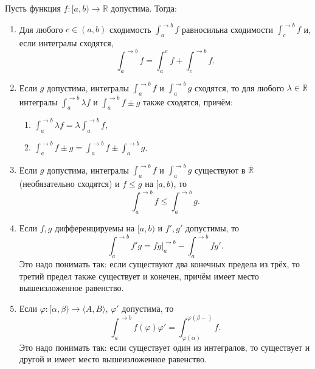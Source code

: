 \begin{theorem}
	Пусть функция \(f \colon [a, b) \to \mathbb{R}\) допустима. Тогда:
	\begin{enumerate}
		\item Для любого \(c \in (a, b)\) сходимость \(\int_a^{\to b} f\) равносильна сходимости \(\int_c^{\to b} f\) и, если интегралы сходятся, \[
		\int_a^{\to b} f = \int_a^c f + \int_c^{\to b} f.
		\]
		\item Если \(g\) допустима, интегралы \(\int_a^{\to b} f\) и \(\int_a^{\to b} g\) сходятся, то для любого \(\lambda \in \mathbb{R}\) интегралы \(\int_a^{\to b} \lambda f\) и \(\int_a^{\to b} f \pm g\) также сходятся, причём:
		\begin{enumerate}
			\item \(\displaystyle\int_a^{\to b} \lambda f = \lambda \displaystyle\int_a^{\to b} f\),
			\item \(\displaystyle\int_a^{\to b} f \pm g = \displaystyle\int_a^{\to b} f \pm \displaystyle\int_a^{\to b} g\).
		\end{enumerate}
		\item Если \(g\) допустима, интегралы \(\int_a^{\to b} f\) и \(\int_a^{\to b} g\) существуют в \(\overline{\mathbb{R}}\) (необязательно сходятся) и \(f \leqslant g\) на \([a, b)\), то \[
		\int_a^{\to b} f \leqslant \int_a^{\to b} g.
		\]
		\item Если \(f, g\) дифференцируемы на \([a, b)\) и \(f', g'\) допустимы, то \[
		\int_a^{\to b} f'g = fg \bigg|_a^{\to b} - \int_a^{\to b} fg'.
		\]
		Это надо понимать так: если существуют два конечных предела из трёх, то третий предел также существует и конечен, причём имеет место вышеизложенное равенство.
		\item Если \(\varphi \colon [\alpha, \beta) \to \langle A, B \rangle\), \(\varphi'\) допустима, то \[
		\int_a^{\to b} f(\varphi) \varphi' = \int_{\varphi(\alpha)}^{\varphi(\beta-)} f.
		\]
		Это надо понимать так: если существует один из интегралов, то существует и другой и имеет место вышеизложенное равенство.
	\end{enumerate}
\end{theorem}

